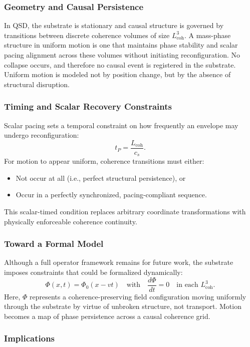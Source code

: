 \documentclass[entropy,article,submit,pdftex,moreauthors]{Definitions/mdpi}
\begin{document}
\subsubsection{Geometry and Causal Persistence}

In QSD, the substrate is stationary and causal structure is governed by transitions between discrete coherence volumes of size \texorpdfstring{\( L_{\text{coh}}^3 \)}{Lcoh\^{}3}. A mass-phase structure in uniform motion is one that maintains phase stability and scalar pacing alignment across these volumes without initiating reconfiguration. No collapse occurs, and therefore no causal event is registered in the substrate. Uniform motion is modeled not by position change, but by the absence of structural disruption.

\subsubsection{Timing and Scalar Recovery Constraints}

Scalar pacing sets a temporal constraint on how frequently an envelope may undergo reconfiguration:
\[
t_P = \frac{L_{\text{coh}}}{c_s}.
\]
For motion to appear uniform, coherence transitions must either:
\begin{itemize}
    \item Not occur at all (i.e., perfect structural persistence), or
    \item Occur in a perfectly synchronized, pacing-compliant sequence.
\end{itemize}
This scalar-timed condition replaces arbitrary coordinate transformations with physically enforceable coherence continuity.

\subsubsection{Toward a Formal Model}

Although a full operator framework remains for future work, the substrate imposes constraints that could be formalized dynamically:
\[
\Phi(x,t) = \Phi_0(x - v t) \quad \text{with} \quad \frac{d\Phi}{dt} = 0 \quad \text{in each } L_{\text{coh}}^3.
\]
Here, \texorpdfstring{\( \Phi \)}{Phi} represents a coherence-preserving field configuration moving uniformly through the substrate by virtue of unbroken structure, not transport. Motion becomes a map of phase persistence across a causal coherence grid.

\subsubsection{Implications}
\end{document}
